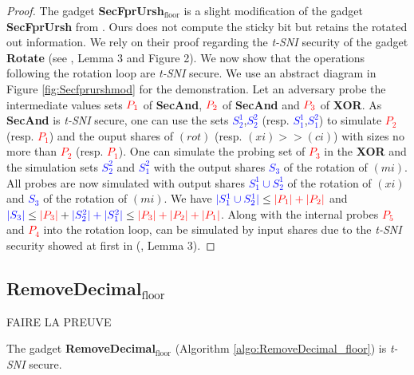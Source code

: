 \documentclass[runningheads]{llncs}
\begin{document}
\begin{proof}
  The gadget \textbf{SecFprUrsh$_\text{floor}$} is a slight modification of the gadget \textbf{SecFprUrsh} from \cite{Chen_Chen_2024}. Ours does not compute the sticky bit but retains the rotated out information. We rely on their proof regarding the \emph{t-SNI} security of the gadget \textbf{Rotate} (see \cite{Chen_Chen_2024}, Lemma 3 and Figure 2). We now show that the operations following the rotation loop are \emph{t-SNI} secure. We use an abstract diagram in Figure \ref{fig:Secfprurshmod} for the demonstration. Let an adversary probe the intermediate values sets $\textcolor{red}{P_1}$ of \textbf{SecAnd}, $\textcolor{red}{P_2}$ of \textbf{SecAnd} and $\textcolor{red}{P_3}$ of \textbf{XOR}. As \textbf{SecAnd} is \emph{t-SNI} secure, one can use the sets \textcolor{blue}{$S_2^1$},\textcolor{blue}{$S_2^2$} (resp. \textcolor{blue}{$S_1^1$},\textcolor{blue}{$S_1^2$}) to simulate \textcolor{red}{$P_2$} (resp. \textcolor{red}{$P_1$}) and the ouput shares of $(rot)$ (resp. $(xi)>>(ci)$) with sizes no more than \textcolor{red}{$P_2$} (resp. \textcolor{red}{$P_1$}). One can simulate the probing set of \textcolor{red}{$P_3$} in the \textbf{XOR} and the simulation sets \textcolor{blue}{$S_2^2$} and \textcolor{blue}{$S_1^2$} with the output shares \textcolor{blue}{$S_3$} of the rotation of $(mi)$. All probes are now simulated with output shares \textcolor{blue}{$S_1^1\cup S_2^1$} of the rotation of $(xi)$ and \textcolor{blue}{$S_3$} of the rotation of $(mi)$. We have $\textcolor{blue}{|S_1^1\cup S_2^1|} \leq \textcolor{red}{|P_1| + |P_2|}$ and $\textcolor{blue}{|S_3|}\leq \textcolor{red}{|P_3|}+\textcolor{blue}{|S_2^2| + |S_1^2|} \leq \textcolor{red}{|P_3|+|P_2|+|P_1|}$. Along with the internal probes \textcolor{red}{$P_5$} and \textcolor{red}{$P_4$} into the rotation loop, can be simulated by input shares due to the \emph{t-SNI} security showed at first in (\cite{Chen_Chen_2024}, Lemma 3).
\end{proof}

\subsection{RemoveDecimal$_\text{floor}$}

FAIRE LA PREUVE

\begin{lemma}\label{lemma:remdec}
  The gadget \textbf{RemoveDecimal$_\text{floor}$} (Algorithm \ref{algo:RemoveDecimal_floor}) is \emph{t-SNI} secure.
\end{lemma}
\end{document}
